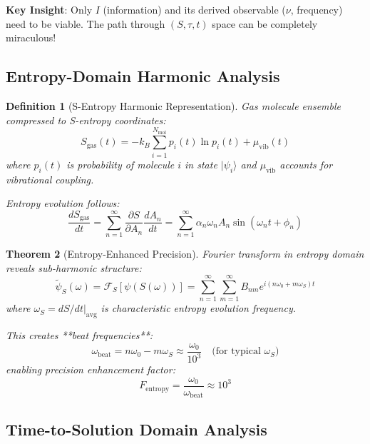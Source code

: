 \documentclass[12pt,a4paper]{article}
\newtheorem{theorem}{Theorem}[section]
\newtheorem{definition}[theorem]{Definition}
\begin{document}
\textbf{Key Insight}: Only $I$ (information) and its derived observable ($\nu$, frequency) need to be viable. The path through $(S, \tau, t)$ space can be completely miraculous!

\subsection{Entropy-Domain Harmonic Analysis}

\begin{definition}[S-Entropy Harmonic Representation]
Gas molecule ensemble compressed to S-entropy coordinates:
\begin{equation}
S_{\text{gas}}(t) = -k_B \sum_{i=1}^{N_{\text{mol}}} p_i(t) \ln p_i(t) + \mu_{\text{vib}}(t)
\end{equation}
where $p_i(t)$ is probability of molecule $i$ in state $|\psi_i\rangle$ and $\mu_{\text{vib}}$ accounts for vibrational coupling.

Entropy evolution follows:
\begin{equation}
\frac{dS_{\text{gas}}}{dt} = \sum_{n=1}^{\infty} \frac{\partial S}{\partial A_n} \frac{dA_n}{dt} = \sum_{n=1}^{\infty} \alpha_n \omega_n A_n \sin(\omega_n t + \phi_n)
\end{equation}
\end{definition}

\begin{theorem}[Entropy-Enhanced Precision]
Fourier transform in entropy domain reveals sub-harmonic structure:
\begin{equation}
\tilde{\psi}_S(\omega) = \mathcal{F}_S[\psi(S(\omega))] = \sum_{n=1}^{\infty} \sum_{m=1}^{\infty} B_{nm} e^{i(n\omega_0 + m\omega_S)t}
\end{equation}
where $\omega_S = dS/dt|_{\text{avg}}$ is characteristic entropy evolution frequency.

This creates **beat frequencies**:
\begin{equation}
\omega_{\text{beat}} = n\omega_0 - m\omega_S \approx \frac{\omega_0}{10^3} \quad \text{(for typical } \omega_S)
\end{equation}
enabling precision enhancement factor:
\begin{equation}
F_{\text{entropy}} = \frac{\omega_0}{\omega_{\text{beat}}} \approx 10^3
\end{equation}
\end{theorem}

\subsection{Time-to-Solution Domain Analysis}
\end{document}
